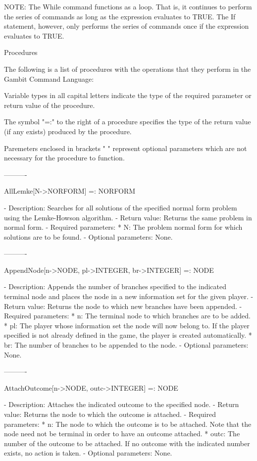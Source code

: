 	NOTE:	The While command functions as a loop.  That is, it continues
		to perform the series of commands as long as the expression
		evaluates to TRUE.  The If statement, however, only performs
		the series of commands once if the expression evaluates to
		TRUE.


Procedures

The following is a list of procedures with the operations that they perform
in the Gambit Command Language:

Variable types in all capital letters indicate the type of the required
parameter or return value of the procedure.

The symbol "=:" to the right of a procedure specifies the type of the return
value (if any exists) produced by the procedure.

Paremeters enclosed in brackets "{ }" represent optional parameters which
are not necessary for the procedure to function.

----------

AllLemke[N->NORFORM] =: NORFORM

   -	Description:  Searches for all solutions of the specified normal form
	problem using the Lemke-Howson algorithm.
   -	Return value:  Returns the same problem in normal form.
   -	Required parameters:
	  *  N:  The problem normal form for which solutions are to be found.
   -	Optional parameters:  None.

----------

AppendNode[n->NODE, pl->INTEGER, br->INTEGER] =: NODE

   -	Description:  Appends the number of branches specified to the indicated
	terminal node and places the node in a new information set for the
	given player.
   -	Return value:  Returns the node to which new branches have been 
	appended.
   -	Required parameters:
	  *  n:  The terminal node to which branches are to be added.
	  *  pl:  The player whose information set the node will now belong to.
	     If the player specified is not already defined in the game, the 
	     player is created automatically. 
	  *  br:  The number of branches to be appended to the node.
   -	Optional parameters:  None.

----------

AttachOutcome[n->NODE, outc->INTEGER] =: NODE

   -	Description:  Attaches the indicated outcome to the specified node.  
   -	Return value:  Returns the node to which the outcome is attached.
   -	Required parameters:
	  *  n:  The node to which the outcome is to be attached.  Note that
	     the node need not be terminal in order to have an outcome 
	     attached.
	  *  outc:  The number of the outcome to be attached.  If no outcome 
	     with the indicated number exists, no action is taken.  
   -	Optional parameters:  None.

